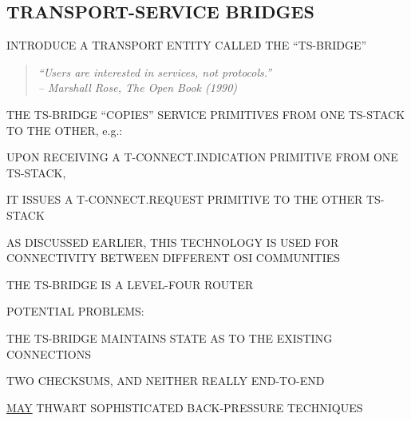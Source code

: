 \begin{bwslide}
\part*	{TRANSPORT-SERVICE BRIDGES}\bf

\begin{nrtc}
\item	INTRODUCE A TRANSPORT ENTITY CALLED THE ``TS-BRIDGE''
\begin{quote}\em
``Users are interested in services, not protocols.''\\ \raggedleft
-- Marshall Rose, The Open Book (1990)
\end{quote}

\item	THE TS-BRIDGE ``COPIES'' SERVICE PRIMITIVES FROM ONE TS-STACK TO THE
	OTHER, e.g.:
    \begin{nrtc}
    \item	UPON RECEIVING A T-CONNECT.INDICATION PRIMITIVE FROM ONE
		TS-STACK,

    \item	IT ISSUES A T-CONNECT.REQUEST PRIMITIVE TO THE OTHER TS-STACK
    \end{nrtc}

\item	AS DISCUSSED EARLIER, THIS TECHNOLOGY IS USED FOR CONNECTIVITY BETWEEN
	DIFFERENT OSI COMMUNITIES
\end{nrtc}
\end{bwslide}






\begin{bwslide}

\begin{nrtc}
\item	THE TS-BRIDGE IS A LEVEL-FOUR ROUTER

\item	POTENTIAL PROBLEMS:
    \begin{nrtc}
    \item	THE TS-BRIDGE MAINTAINS STATE AS TO THE EXISTING CONNECTIONS

    \item	TWO CHECKSUMS, AND NEITHER REALLY END-TO-END

    \item	\underline{MAY} THWART SOPHISTICATED BACK-PRESSURE TECHNIQUES
    \end{nrtc}
\end{nrtc}
\end{bwslide}


